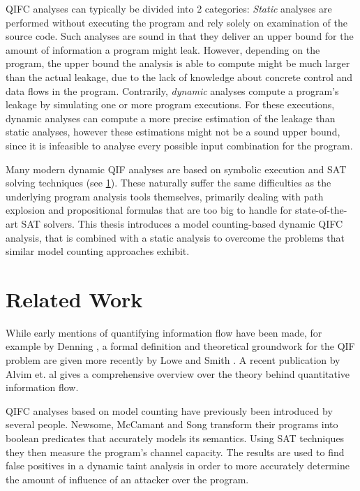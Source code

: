 QIFC analyses can typically be divided into 2 categories: \emph{Static} analyses are performed without executing the program and rely solely on examination of the source code. Such analyses are sound in that they deliver an upper bound for the amount of information a program might leak. However, depending on the program, the upper bound the analysis is able to compute might be much larger than the actual leakage, due to the lack of knowledge about concrete control and data flows in the program. Contrarily, \emph{dynamic} analyses compute a program's leakage by simulating one or more program executions. For these executions, dynamic analyses can compute a more precise estimation of the leakage than static analyses, however these estimations might not be a sound upper bound, since it is infeasible to analyse every possible input combination for the program.

Many modern dynamic QIF analyses are based on symbolic execution and SAT solving techniques (see \ref{sec:relWork}). These naturally suffer the same difficulties as the underlying program analysis tools themselves, primarily dealing with path explosion and propositional formulas that are too big to handle for state-of-the-art SAT solvers. This thesis introduces a model counting-based dynamic QIFC analysis, that is combined with a static analysis to overcome the problems that similar model counting approaches exhibit. 

\section{Related Work}\label{sec:relWork}

While early mentions of quantifying information flow have been made, for example by Denning \cite{denning82}, a formal definition and theoretical groundwork for the QIF problem are given more recently by Lowe \cite{lowe02} and Smith \cite{smith09}. A recent publication by Alvim et. al \cite{alvim19} gives a comprehensive overview over the theory behind quantitative information flow.

QIFC analyses based on model counting have previously been introduced by several people.
Newsome, McCamant and Song \cite{newsome09} transform their programs into boolean predicates that accurately models its semantics. Using SAT techniques they then measure the program's channel capacity. The results are used to find false positives in a dynamic taint analysis in order to more accurately determine the amount of influence of an attacker over the program.

